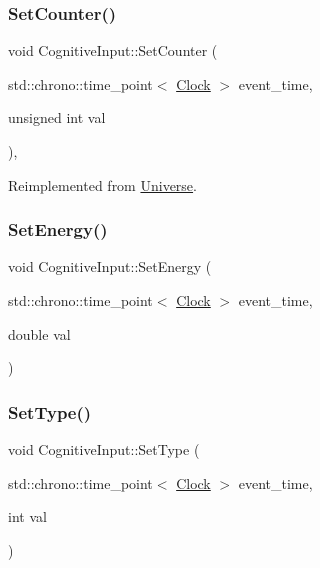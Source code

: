 \mbox{\label{classCognitiveInput_a4f09c1f176b5406d95a14d7cb1ab75e6}} 
\subsubsection{\texorpdfstring{Set\+Counter()}{SetCounter()}}
{\footnotesize\ttfamily void Cognitive\+Input\+::\+Set\+Counter (\begin{DoxyParamCaption}\item[{std\+::chrono\+::time\+\_\+point$<$ \mbox{\hyperlink{universe_8h_a0ef8d951d1ca5ab3cfaf7ab4c7a6fd80}{Clock}} $>$}]{event\+\_\+time,  }\item[{unsigned int}]{val }\end{DoxyParamCaption})\hspace{0.3cm}{\ttfamily [inline]}, {\ttfamily [virtual]}}



Reimplemented from \mbox{\hyperlink{classUniverse_aa22202ae740eb1355529afcb13285e91}{Universe}}.

\mbox{\label{classCognitiveInput_a3498a8b5333606ef4d089e6c427ddf74}} 
\subsubsection{\texorpdfstring{Set\+Energy()}{SetEnergy()}}
{\footnotesize\ttfamily void Cognitive\+Input\+::\+Set\+Energy (\begin{DoxyParamCaption}\item[{std\+::chrono\+::time\+\_\+point$<$ \mbox{\hyperlink{universe_8h_a0ef8d951d1ca5ab3cfaf7ab4c7a6fd80}{Clock}} $>$}]{event\+\_\+time,  }\item[{double}]{val }\end{DoxyParamCaption})\hspace{0.3cm}{\ttfamily [inline]}}

\mbox{\label{classCognitiveInput_a37d38512fb190431b4baf8f990c077a9}} 
\subsubsection{\texorpdfstring{Set\+Type()}{SetType()}}
{\footnotesize\ttfamily void Cognitive\+Input\+::\+Set\+Type (\begin{DoxyParamCaption}\item[{std\+::chrono\+::time\+\_\+point$<$ \mbox{\hyperlink{universe_8h_a0ef8d951d1ca5ab3cfaf7ab4c7a6fd80}{Clock}} $>$}]{event\+\_\+time,  }\item[{int}]{val }\end{DoxyParamCaption})\hspace{0.3cm}{\ttfamily [inline]}}

